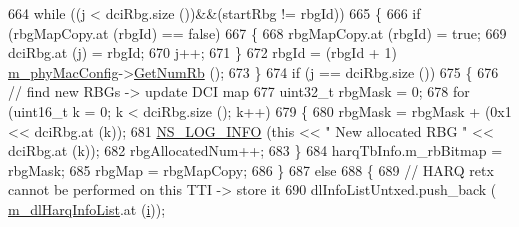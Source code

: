 \begin{DoxyCode}
{664                                         \textcolor{keywordflow}{while} ((j < dciRbg.size ())&&(startRbg != rbgId))
665                                         \{
666                                                 \textcolor{keywordflow}{if} (rbgMapCopy.at (rbgId) == \textcolor{keyword}{false})
667                                                 \{
668                                                         rbgMapCopy.at (rbgId) = \textcolor{keyword}{true};
669                                                         dciRbg.at (j) = rbgId;
670                                                         j++;
671                                                 \}
672                                                 rbgId = (rbgId + 1) %
      \hyperlink{classns3_1_1MmWaveMacScheduler_a24d7af4971d2e500fe543cefbafa2fd9}{m\_phyMacConfig}->\hyperlink{classns3_1_1MmWavePhyMacCommon_a4c5f323fd722d6eec52efda5d76f97ad}{GetNumRb} ();
673                                         \}
674                                         \textcolor{keywordflow}{if} (j == dciRbg.size ())
675                                         \{
676                                                 \textcolor{comment}{// find new RBGs -> update DCI map}
677                                                 uint32\_t rbgMask = 0;
678                                                 \textcolor{keywordflow}{for} (uint16\_t k = 0; k < dciRbg.size (); k++)
679                                                 \{
680                                                         rbgMask = rbgMask + (0x1 << dciRbg.at (k));
681                                                         \hyperlink{group__logging_gafbd73ee2cf9f26b319f49086d8e860fb}{NS\_LOG\_INFO} (\textcolor{keyword}{this} << \textcolor{stringliteral}{" New allocated RBG
       "} << dciRbg.at (k));
682                                                         rbgAllocatedNum++;
683                                                 \}
684                                                 harqTbInfo.m\_rbBitmap = rbgMask;
685                                                 rbgMap = rbgMapCopy;
686                                         \}
687                                         \textcolor{keywordflow}{else}
688                                         \{
689                                                 \textcolor{comment}{// HARQ retx cannot be performed on this TTI -> store it}
690                                                 dlInfoListUntxed.push\_back (
      \hyperlink{classns3_1_1MmWaveRrMacScheduler_a1b1043d7f9994e2ee6a7e1b368e9d7a1}{m\_dlHarqInfoList}.at (\hyperlink{bernuolliDistribution_8m_a6f6ccfcf58b31cb6412107d9d5281426}{i}));
}
\end{DoxyCode}
